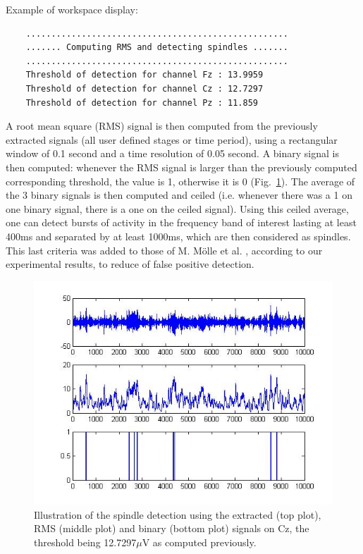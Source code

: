 \documentclass[a4paper,titlepage]{article}
\begin{document}
Example of workspace display: 
\begin{center}
\begin{verbatim}
	....................................................
	....... Computing RMS and detecting spindles .......
	....................................................
	Threshold of detection for channel Fz : 13.9959
	Threshold of detection for channel Cz : 12.7297
	Threshold of detection for channel Pz : 11.859
\end{verbatim}
\end{center}
A root mean square (RMS) signal is then computed from the previously extracted signals (all user defined stages or time period), using a rectangular window of 0.1 second and a time resolution of 0.05 second. A binary signal is then computed: whenever the RMS signal is larger than the previously computed corresponding threshold, the value is 1, otherwise it is 0 (Fig.~\ref{fig:SP_datarms}). The average of the 3 binary signals is then computed and ceiled (i.e. whenever there was a 1 on one binary signal, there is a one on the ceiled signal). Using this ceiled average, one can detect bursts of activity in the frequency band of interest lasting at least 400ms and separated by at least 1000ms, which are then considered as spindles. This last criteria was added to those of M. M\"{o}lle et al. \cite{Moelle2002}, according to our experimental results, to reduce of false positive detection.
\begin{figure}[ht]
	\centering
		\includegraphics[width=12cm]{images/FIG18_SP_datarms.jpg}
	\caption{Illustration of the spindle detection using the extracted (top plot), RMS (middle plot) and binary (bottom plot) signals on Cz, the threshold being 12.7297$\mu$V as computed previously.
	\label{fig:SP_datarms}}
\end{figure}  
\end{document}
